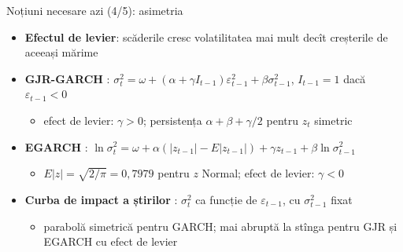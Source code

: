 \begin{frame}{Noțiuni necesare azi (4/5): asimetria}
\itemsize{\small}
\begin{itemize}
    \item \textbf{Efectul de levier}: scăderile cresc volatilitatea mai mult decît creșterile de aceeași mărime 
    \item \textbf{GJR-GARCH} : $\sigma_t^2 = \omega + (\alpha + \gamma I_{t-1})\varepsilon_{t-1}^2 + \beta\sigma_{t-1}^2$, $I_{t-1} = 1$ dacă $\varepsilon_{t-1} < 0$
    \begin{itemize}
        \item efect de levier: $\gamma > 0$; persistența $\alpha + \beta + \gamma/2$ pentru $z_t$ simetric
    \end{itemize}
    \item \textbf{EGARCH} : $\ln\sigma_t^2 = \omega + \alpha(|z_{t-1}| - E|z_{t-1}|) + \gamma z_{t-1} + \beta\ln\sigma_{t-1}^2$
    \begin{itemize}
        \item $E|z| = \sqrt{2/\pi} = 0{,}7979$ pentru $z$ Normal; efect de levier: $\gamma < 0$
    \end{itemize}
    \item \textbf{Curba de impact a știrilor} : $\sigma_t^2$ ca funcție de $\varepsilon_{t-1}$, cu $\sigma_{t-1}^2$ fixat
    \begin{itemize}
        \item parabolă simetrică pentru GARCH; mai abruptă la stînga pentru GJR și EGARCH cu efect de levier
    \end{itemize}
\end{itemize}
\end{frame}

